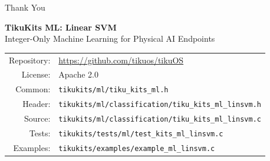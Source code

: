 \documentclass[aspectratio=169, 10pt]{beamer}
\begin{document}
\begin{frame}{Thank You}
\begin{center}
\Large\textbf{TikuKits ML: Linear SVM}\\[0.5em]
\normalsize Integer-Only Machine Learning for Physical AI Endpoints\\[1.5em]

\begin{tabular}{rl}
  Repository: & \url{https://github.com/tikuos/tikuOS} \\
  License:    & Apache 2.0 \\
  Common:     & \texttt{tikukits/ml/tiku\_kits\_ml.h} \\
  Header:     & \texttt{tikukits/ml/classification/tiku\_kits\_ml\_linsvm.h} \\
  Source:     & \texttt{tikukits/ml/classification/tiku\_kits\_ml\_linsvm.c} \\
  Tests:      & \texttt{tikukits/tests/ml/test\_kits\_ml\_linsvm.c} \\
  Examples:   & \texttt{tikukits/examples/example\_ml\_linsvm.c} \\
\end{tabular}
\end{center}
\end{frame}
\end{document}
